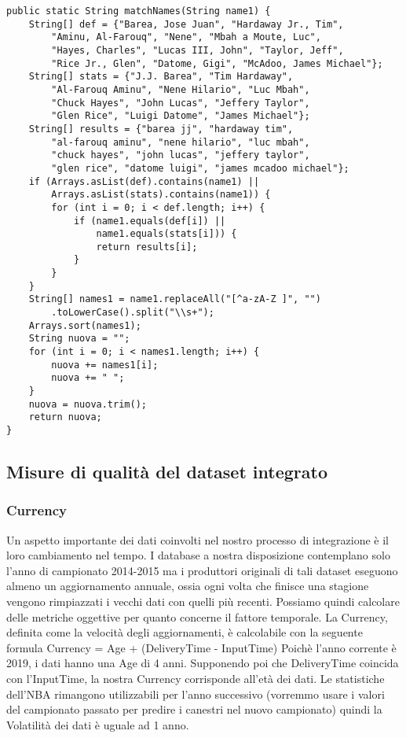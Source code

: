\begin{code}
\begin{verbatim}
public static String matchNames(String name1) {
	String[] def = {"Barea, Jose Juan", "Hardaway Jr., Tim", 
		"Aminu, Al-Farouq", "Nene", "Mbah a Moute, Luc",
		"Hayes, Charles", "Lucas III, John", "Taylor, Jeff",
		"Rice Jr., Glen", "Datome, Gigi", "McAdoo, James Michael"};
	String[] stats = {"J.J. Barea", "Tim Hardaway", 
		"Al-Farouq Aminu", "Nene Hilario", "Luc Mbah",
		"Chuck Hayes", "John Lucas", "Jeffery Taylor",
		"Glen Rice", "Luigi Datome", "James Michael"};
	String[] results = {"barea jj", "hardaway tim", 
		"al-farouq aminu", "nene hilario", "luc mbah",
		"chuck hayes", "john lucas", "jeffery taylor",
		"glen rice", "datome luigi", "james mcadoo michael"};
	if (Arrays.asList(def).contains(name1) || 
		Arrays.asList(stats).contains(name1)) {
		for (int i = 0; i < def.length; i++) {
			if (name1.equals(def[i]) || 
				name1.equals(stats[i])) {
				return results[i];
			}
		}  
	}
	String[] names1 = name1.replaceAll("[^a-zA-Z ]", "")
		.toLowerCase().split("\\s+");
	Arrays.sort(names1);
	String nuova = "";
	for (int i = 0; i < names1.length; i++) {
		nuova += names1[i];
		nuova += " ";
	}
	nuova = nuova.trim();
	return nuova;
}
\end{verbatim}
\end{code}


\subsection{Misure di qualità del dataset integrato}

\subsubsection{Currency}
Un aspetto importante dei dati coinvolti nel nostro processo di integrazione è il loro cambiamento nel tempo. I database a nostra disposizione contemplano solo l’anno di campionato 2014-2015 ma i produttori originali di tali dataset eseguono almeno un aggiornamento annuale, ossia ogni volta che finisce una stagione vengono rimpiazzati i vecchi dati con quelli più recenti.
Possiamo quindi calcolare delle metriche oggettive per quanto concerne il fattore temporale.
La Currency, definita come la velocità degli aggiornamenti, è calcolabile con la seguente formula\cite{doi:10.1287/mnsc.44.4.462}
Currency = Age + (DeliveryTime - InputTime)
Poichè l’anno corrente è 2019, i dati hanno una Age di 4 anni. Supponendo poi che DeliveryTime coincida con l’InputTime, la nostra Currency corrisponde all’età dei dati.
Le statistiche dell’NBA rimangono utilizzabili per l’anno successivo (vorremmo usare i valori del campionato passato per predire i canestri nel nuovo campionato) quindi la Volatilità dei dati è uguale ad 1 anno.

